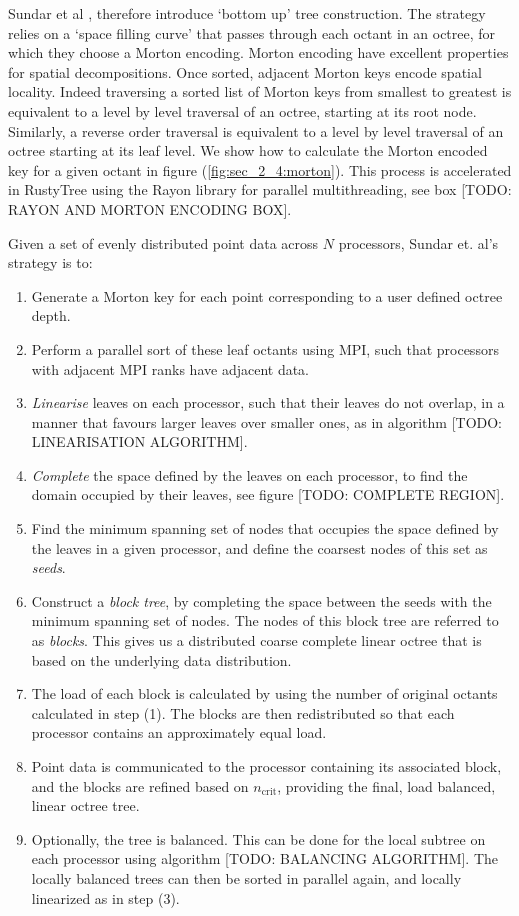 Sundar et al \cite{sundar2008bottom}, therefore introduce `bottom up' tree construction. The strategy relies on a `space filling curve' that passes through each octant in an octree, for which they choose a Morton encoding. Morton encoding have excellent properties for spatial decompositions. Once sorted, adjacent Morton keys encode spatial locality. Indeed traversing a sorted list of Morton keys from smallest to greatest is equivalent to a level by level traversal of an octree, starting at its root node. Similarly, a reverse order traversal is equivalent to a level by level traversal of an octree starting at its leaf level. We show how to calculate the Morton encoded key for a given octant in figure (\ref{fig:sec_2_4:morton}). This process is accelerated in RustyTree using the Rayon library for parallel multithreading, see box [TODO: RAYON AND MORTON ENCODING BOX].

Given a set of evenly distributed point data across $N$ processors, Sundar et. al's strategy is to:

\begin{enumerate}
    \item Generate a Morton key for each point corresponding to a user defined octree depth.
    \item Perform a parallel sort of these leaf octants using MPI, such that processors with adjacent MPI ranks have adjacent data.
    \item \textit{Linearise} leaves on each processor, such that their leaves do not overlap, in a manner that favours larger leaves over smaller ones, as in algorithm [TODO: LINEARISATION ALGORITHM].
    \item \textit{Complete} the space defined by the leaves on each processor, to find the domain occupied by their leaves, see figure [TODO: COMPLETE REGION].
    \item Find the minimum spanning set of nodes that occupies the space defined by the leaves in a given processor, and define the coarsest nodes of this set as \textit{seeds}.
    \item Construct a \textit{block tree}, by completing the space between the seeds with the minimum spanning set of nodes. The nodes of this block tree are referred to as \textit{blocks}. This gives us a distributed coarse complete linear octree that is based on the underlying data distribution.
    \item The load of each block is calculated by using the number of original octants calculated in step (1). The blocks are then redistributed so that each processor contains an approximately equal load.
    \item Point data is communicated to the processor containing its associated block, and the blocks are refined based on $n_{\text{crit}}$, providing the final, load balanced, linear octree tree.
    \item Optionally, the tree is balanced. This can be done for the local subtree on each processor using algorithm [TODO: BALANCING ALGORITHM]. The locally balanced trees can then be sorted in parallel again, and locally linearized as in step (3).
\end{enumerate}

